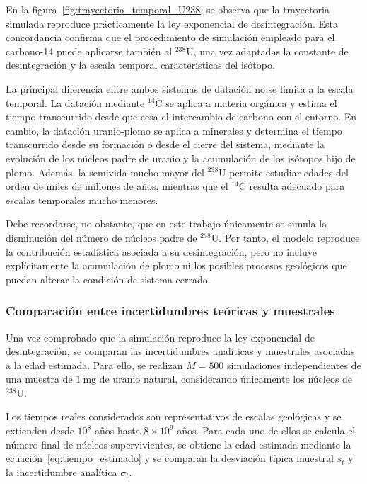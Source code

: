 \documentclass[12pt,a4paper]{article}
\begin{document}
En la figura~\ref{fig:trayectoria_temporal_U238} se observa que la trayectoria simulada reproduce prácticamente la ley exponencial de desintegración. Esta concordancia confirma que el procedimiento de simulación empleado para el carbono-14 puede aplicarse también al $^{238}\text{U}$, una vez adaptadas la constante de desintegración y la escala temporal características del isótopo.

La principal diferencia entre ambos sistemas de datación no se limita a la escala temporal. La datación mediante $^{14}\text{C}$ se aplica a materia orgánica y estima el tiempo transcurrido desde que cesa el intercambio de carbono con el entorno. En cambio, la datación uranio-plomo se aplica a minerales y determina el tiempo transcurrido desde su formación o desde el cierre del sistema, mediante la evolución de los núcleos padre de uranio y la acumulación de los isótopos hijo de plomo. Además, la semivida mucho mayor del $^{238}\text{U}$ permite estudiar edades del orden de miles de millones de años, mientras que el $^{14}\text{C}$ resulta adecuado para escalas temporales mucho menores.

Debe recordarse, no obstante, que en este trabajo únicamente se simula la disminución del número de núcleos padre de $^{238}\text{U}$. Por tanto, el modelo reproduce la contribución estadística asociada a su desintegración, pero no incluye explícitamente la acumulación de plomo ni los posibles procesos geológicos que puedan alterar la condición de sistema cerrado.

\subsubsection{Comparación entre incertidumbres teóricas y muestrales}

Una vez comprobado que la simulación reproduce la ley exponencial de desintegración, se comparan las incertidumbres analíticas y muestrales asociadas a la edad estimada. Para ello, se realizan $M=500$ simulaciones independientes de una muestra de $1\ \text{mg}$ de uranio natural, considerando únicamente los núcleos de $^{238}\text{U}$.

Los tiempos reales considerados son representativos de escalas geológicas y se extienden desde $10^8$ años hasta $8\times 10^9$ años. Para cada uno de ellos se calcula el número final de núcleos supervivientes, se obtiene la edad estimada mediante la ecuación~\eqref{eq:tiempo_estimado} y se comparan la desviación típica muestral $s_t$ y la incertidumbre analítica $\sigma_t$.
\end{document}
